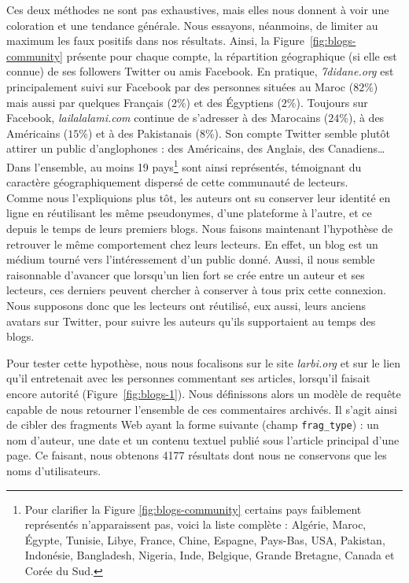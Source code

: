 \documentclass[symmetric,justified,marginals=raggedouter]{tufte-book}
\begin{document}
Ces deux méthodes ne sont pas exhaustives, mais elles nous donnent à voir une coloration et une tendance générale. Nous essayons, néanmoins, de limiter au maximum les faux positifs dans nos résultats. Ainsi, la Figure~\ref{fig:blogs-community} présente pour chaque compte, la répartition géographique (si elle est connue) de ses followers Twitter ou amis Facebook. En pratique, \textit{7didane.org} est principalement suivi sur Facebook par des personnes situées au Maroc ($82\%$) mais aussi par quelques Français ($2\%$) et des Égyptiens ($2\%$). Toujours sur Facebook, \textit{lailalalami.com} continue de s'adresser à des Marocains ($24\%$), à des Américains ($15\%$) et à des Pakistanais ($8\%$). Son compte Twitter semble plutôt attirer un public d'anglophones : des Américains, des Anglais, des Canadiens\ldots{} Dans l'ensemble, au moins 19 pays\footnote{\RaggedOuter Pour clarifier la Figure \ref{fig:blogs-community} certains pays faiblement représentés n'apparaissent pas, voici la liste complète : Algérie, Maroc, Égypte, Tunisie, Libye, France, Chine, Espagne, Pays-Bas, USA, Pakistan, Indonésie, Bangladesh, Nigeria, Inde, Belgique, Grande Bretagne, Canada et Corée du Sud.} sont ainsi représentés, témoignant du caractère géographiquement dispersé de cette communauté de lecteurs. \\

\noindent Comme nous l'expliquions plus tôt, les auteurs ont su conserver leur identité en ligne en réutilisant les même pseudonymes, d'une plateforme à l'autre, et ce depuis le temps de leurs premiers blogs. Nous faisons maintenant l'hypothèse de retrouver le même comportement chez leurs lecteurs. En effet, un blog est un médium tourné vers l'intéressement d'un public donné. Aussi, il nous semble raisonnable d'avancer que lorsqu'un lien fort se crée entre un auteur et ses lecteurs, ces derniers peuvent chercher à conserver à tous prix cette connexion. Nous supposons donc que les lecteurs ont réutilisé, eux aussi, leurs anciens avatars sur Twitter, pour suivre les auteurs qu'ils supportaient au temps des blogs.

Pour tester cette hypothèse, nous nous focalisons sur le site \textit{larbi.org} et sur le lien qu'il entretenait avec les personnes commentant ses articles, lorsqu'il faisait encore autorité (Figure~\ref{fig:blogs-1}). Nous définissons alors un modèle de requête capable de nous retourner l'ensemble de ces commentaires archivés. Il s'agit ainsi de cibler des fragments Web ayant la forme suivante (champ \texttt{frag\_type}) : un nom d'auteur, une date et un contenu textuel publié sous l'article principal d'une page. Ce faisant, nous obtenons 4177 résultats dont nous ne conservons que les noms d'utilisateurs.
\end{document}

